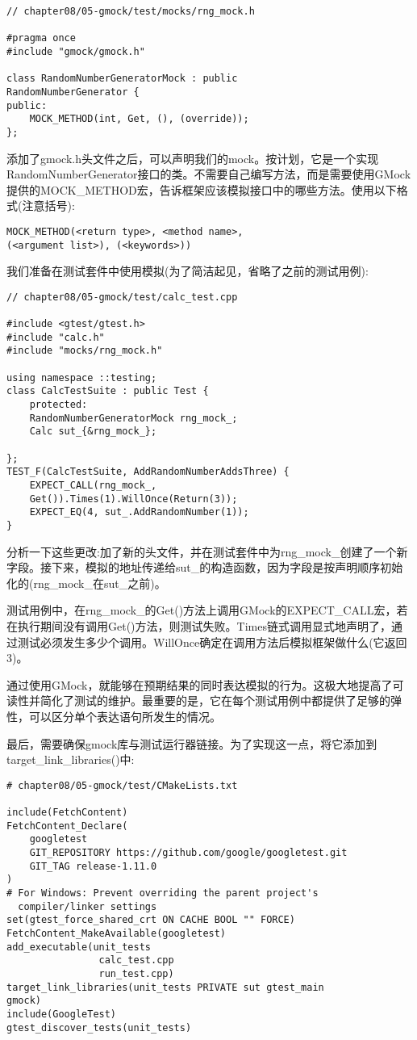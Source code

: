 \begin{lstlisting}[style=styleCXX]
// chapter08/05-gmock/test/mocks/rng_mock.h

#pragma once
#include "gmock/gmock.h"

class RandomNumberGeneratorMock : public
RandomNumberGenerator {
public:
	MOCK_METHOD(int, Get, (), (override));
};
\end{lstlisting}

添加了gmock.h头文件之后，可以声明我们的mock。按计划，它是一个实现RandomNumberGenerator接口的类。不需要自己编写方法，而是需要使用GMock提供的MOCK\_METHOD宏，告诉框架应该模拟接口中的哪些方法。使用以下格式(注意括号):

\begin{lstlisting}[style=styleCXX]
MOCK_METHOD(<return type>, <method name>,
(<argument list>), (<keywords>))
\end{lstlisting}

我们准备在测试套件中使用模拟(为了简洁起见，省略了之前的测试用例):

\begin{lstlisting}[style=styleCXX]
// chapter08/05-gmock/test/calc_test.cpp

#include <gtest/gtest.h>
#include "calc.h"
#include "mocks/rng_mock.h"

using namespace ::testing;
class CalcTestSuite : public Test {
	protected:
	RandomNumberGeneratorMock rng_mock_;
	Calc sut_{&rng_mock_};

};
TEST_F(CalcTestSuite, AddRandomNumberAddsThree) {
	EXPECT_CALL(rng_mock_,
	Get()).Times(1).WillOnce(Return(3));
	EXPECT_EQ(4, sut_.AddRandomNumber(1));
}
\end{lstlisting}

分析一下这些更改:加了新的头文件，并在测试套件中为rng\_mock\_创建了一个新字段。接下来，模拟的地址传递给sut\_的构造函数，因为字段是按声明顺序初始化的(rng\_mock\_在sut\_之前)。

测试用例中，在rng\_mock\_的Get()方法上调用GMock的EXPECT\_CALL宏，若在执行期间没有调用Get()方法，则测试失败。Times链式调用显式地声明了，通过测试必须发生多少个调用。WillOnce确定在调用方法后模拟框架做什么(它返回3)。

通过使用GMock，就能够在预期结果的同时表达模拟的行为。这极大地提高了可读性并简化了测试的维护。最重要的是，它在每个测试用例中都提供了足够的弹性，可以区分单个表达语句所发生的情况。

最后，需要确保gmock库与测试运行器链接。为了实现这一点，将它添加到target\_link\_libraries()中:

\begin{lstlisting}[style=styleCMake]
# chapter08/05-gmock/test/CMakeLists.txt

include(FetchContent)
FetchContent_Declare(
	googletest
	GIT_REPOSITORY https://github.com/google/googletest.git
	GIT_TAG release-1.11.0
)
# For Windows: Prevent overriding the parent project's
  compiler/linker settings
set(gtest_force_shared_crt ON CACHE BOOL "" FORCE)
FetchContent_MakeAvailable(googletest)
add_executable(unit_tests
				calc_test.cpp
				run_test.cpp)
target_link_libraries(unit_tests PRIVATE sut gtest_main
gmock)
include(GoogleTest)
gtest_discover_tests(unit_tests)
\end{lstlisting}

